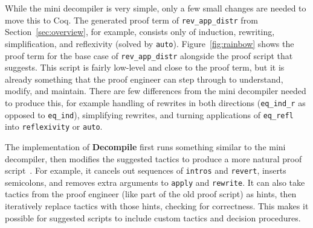 While the mini decompiler is very simple, only a few small changes are needed
to move this to Coq.
The generated proof term of \lstinline{rev_app_distr} from Section~\ref{sec:overview},
for example, consists only of induction, rewriting, simplification, and reflexivity (solved by \lstinline{auto}).
Figure~\ref{fig:rainbow} shows the proof term for the base case of \lstinline{rev_app_distr} 
alongside the proof script that \toolnamec suggests.
This script is fairly low-level and close to the proof term, but it is already something that the proof engineer
can step through to understand, modify, and maintain.
There are few differences from the mini decompiler needed to produce this,
for example handling of rewrites in both directions (\lstinline{eq_ind_r} as opposed to \lstinline{eq_ind}),
simplifying rewrites,
and turning applications of \lstinline{eq_refl} into \lstinline{reflexivity} or \lstinline{auto}.

The implementation of \textbf{Decompile} first runs something similar to the mini decompiler, then modifies the suggested tactics to produce a more natural proof script~\href{https://github.com/uwplse/coq-plugin-lib/tree/9ef05815c261de9c99b604c6b581ba1c4fbc1a46/src/coq/decompiler/decompiler.ml}{}. %
For example, it cancels out sequences of \lstinline{intros} and \lstinline{revert},
inserts semicolons, and removes extra arguments to \lstinline{apply} and \lstinline{rewrite}. %
It can also take tactics from the proof engineer (like part of the old proof script) as hints,
then iteratively replace tactics with those hints, checking for correctness.
This makes it possible for suggested scripts to include custom tactics and decision procedures.

